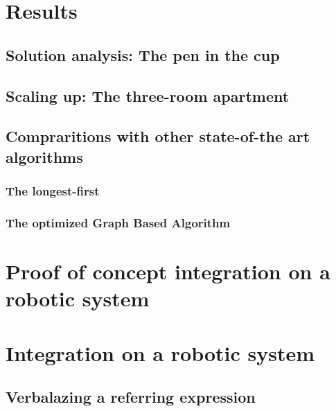 \section{Results}

\subsection{Solution analysis: The pen in the cup}

\subsection{Scaling up: The three-room apartment}

\subsection{Compraritions with other state-of-the art algorithms}

\subsubsection{The longest-first}

\subsubsection{The optimized Graph Based Algorithm}

\section{Proof of concept integration on a robotic system}

\section{Integration on a robotic system}

\subsection{Verbalazing a referring expression}

